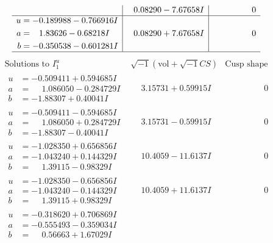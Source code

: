 \documentclass[1p]{elsarticle_modified}
\theoremstyle{definition}
\newcommand{\I}{\sqrt{-1}}
\begin{document}
$$\begin{array}{c|c|c}
 & \phantom{-}0.08290 - 7.67658 I & \phantom{-0.000000 } 0 \\ \hline\begin{aligned}
u &= -0.189988 - 0.766916 I \\
a &= \phantom{-}1.83626 - 0.68218 I \\
b &= -0.350538 - 0.601281 I\end{aligned}
 & \phantom{-}0.08290 + 7.67658 I & \phantom{-0.000000 } 0\\
 \hline 
 \end{array}$$\newpage$$\begin{array}{c|c|c}  
\text{Solutions to }I^u_{1}& \I (\text{vol} + \sqrt{-1}CS) & \text{Cusp shape}\\
 \hline 
\begin{aligned}
u &= -0.509411 + 0.594685 I \\
a &= \phantom{-}1.086050 - 0.284729 I \\
b &= -1.88307 + 0.40041 I\end{aligned}
 & \phantom{-}3.15731 + 0.59915 I & \phantom{-0.000000 } 0 \\ \hline\begin{aligned}
u &= -0.509411 - 0.594685 I \\
a &= \phantom{-}1.086050 + 0.284729 I \\
b &= -1.88307 - 0.40041 I\end{aligned}
 & \phantom{-}3.15731 - 0.59915 I & \phantom{-0.000000 } 0 \\ \hline\begin{aligned}
u &= -1.028350 + 0.656856 I \\
a &= -1.043240 + 0.144329 I \\
b &= \phantom{-}1.39115 - 0.98329 I\end{aligned}
 & \phantom{-}10.4059 - 11.6137 I & \phantom{-0.000000 } 0 \\ \hline\begin{aligned}
u &= -1.028350 - 0.656856 I \\
a &= -1.043240 - 0.144329 I \\
b &= \phantom{-}1.39115 + 0.98329 I\end{aligned}
 & \phantom{-}10.4059 + 11.6137 I & \phantom{-0.000000 } 0 \\ \hline\begin{aligned}
u &= -0.318620 + 0.706869 I \\
a &= -0.555493 - 0.359034 I \\
b &= \phantom{-}0.56663 + 1.67029 I\end{aligned}

\end{array}$$
\end{document}

